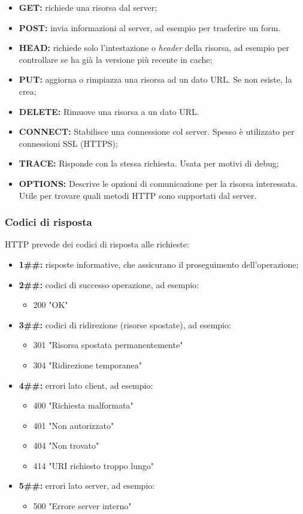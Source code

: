 \documentclass[a4paper,11pt]{article}
\begin{document}
\begin{itemize}
	\item \textbf{GET:} richiede una risorsa dal server;
	\item \textbf{POST:} invia informazioni al server, ad esempio per trasferire un form.
	\item \textbf{HEAD:} richiede solo l'intestazione o \textit{header} della risorsa, ad esempio per controllare se ha già la versione più recente in cache;
	\item \textbf{PUT:} aggiorna o rimpiazza una risorsa ad un dato URL. Se non esiste, la crea;
	\item \textbf{DELETE:} Rimuove una risorsa a un dato URL.
	\item \textbf{CONNECT:} Stabilisce una connessione col server. Spesso è utilizzato per connessioni SSL (HTTPS);
	\item \textbf{TRACE:} Risponde con la stessa richiesta. Usata per motivi di debug;
	\item \textbf{OPTIONS:} Descrive le opzioni di comunicazione per la risorsa interessata. Utile per trovare quali metodi HTTP sono supportati dal server.
\end{itemize}

\subsubsection{Codici di risposta}
HTTP prevede dei codici di risposta alle richieste:

\begin{itemize}
	\item \textbf{1\#\#:} risposte informative, che assicurano il proseguimento dell'operazione;
	\item \textbf{2\#\#:} codici di successo operazione, ad esempio:
	\begin{itemize}
		\item 200 "OK"
	\end{itemize}
	\item \textbf{3\#\#:} codici di ridirezione (risorse spostate), ad esempio:
		\begin{itemize}
			\item 301 "Risorsa spostata permanentemente"
			\item 304 "Ridirezione temporanea"
		\end{itemize}
	\item \textbf{4\#\#:} errori lato client, ad esempio: 
		\begin{itemize}
			\item 400 "Richiesta malformata"
			\item 401 "Non autorizzato"
			\item 404 "Non trovato"
			\item 414 "URI richiesto troppo lungo"
		\end{itemize}
	\item \textbf{5\#\#:} errori lato server, ad esempio:
		\begin{itemize}
			\item 500 "Errore server interno"
		\end{itemize}
\end{itemize}
\end{document}
